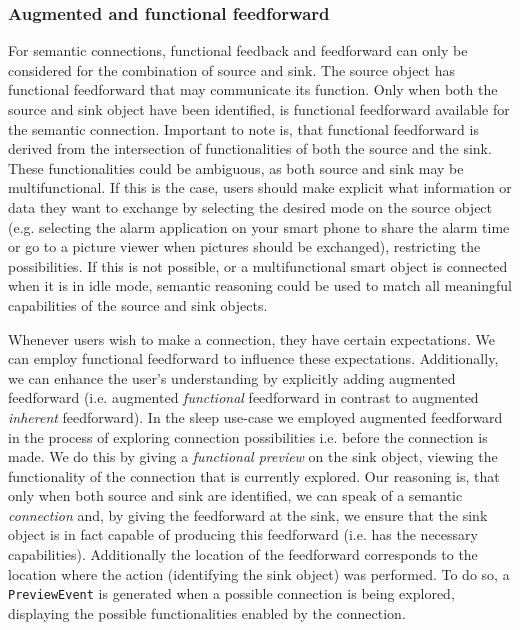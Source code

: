 \subsubsection{Augmented and functional feedforward}
\label{section:augmentedFunctionalFf}
For semantic connections, functional feedback and feedforward can only be considered for the combination of source and sink. The source object has functional feedforward that may communicate its function. Only when both the source and sink object have been identified, is functional feedforward available for the semantic connection. Important to note is, that  functional feedforward is derived from the intersection of functionalities of both the source and the sink. These functionalities could be ambiguous, as both source and sink may be multifunctional. If this is the case, users should make explicit what information or data they want to exchange by selecting the desired mode on the source object (e.g. selecting the alarm application on your smart phone to share the alarm time or go to a picture viewer when pictures should be exchanged), restricting the possibilities. If this is not possible, or a multifunctional smart object is connected when it is in idle mode, semantic reasoning could be used to match all meaningful capabilities of the source and sink objects.

Whenever users wish to make a connection, they have certain expectations. We can employ functional feedforward to influence these expectations. Additionally, we can enhance the user's understanding by explicitly adding augmented feedforward (i.e. augmented \emph{functional} feedforward in contrast to augmented \emph{inherent} feedforward). In the sleep use-case we employed augmented feedforward in the process of exploring connection possibilities i.e. before the connection is made. We do this by giving a \emph{functional preview} on the sink object, viewing the functionality of the connection that is currently explored. Our reasoning is, that only when both source and sink are identified, we can speak of a semantic \emph{connection} and, by giving the feedforward at the sink, we ensure that the sink object is in fact capable of producing this feedforward (i.e. has the necessary capabilities). Additionally the location of the feedforward corresponds to the location where the action (identifying the sink object) was performed. To do so, a \texttt{PreviewEvent} is generated  when a possible connection is being explored, displaying the possible functionalities enabled by the connection.

